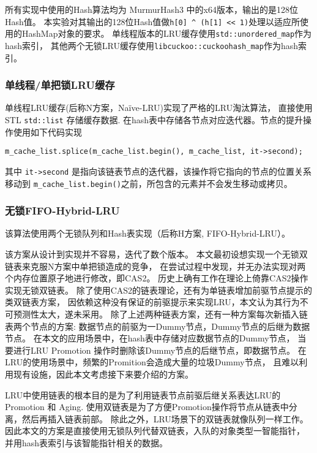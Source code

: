 所有实现中使用的Hash算法均为 MurmurHash3 中的x64版本，输出的是128位Hash值。
本实验对其输出的128位Hash值做\verb|h[0] ^ (h[1] << 1)|处理以适应所使用的HashMap对象的要求。
单线程版本的LRU缓存使用\verb|std::unordered_map|作为hash索引，
其他两个无锁LRU缓存使用\verb|libcuckoo::cuckoohash_map|作为hash索引。

\subsubsection{单线程/单把锁LRU缓存}

单线程LRU缓存(后称N方案，Na\"{i}ve-LRU)实现了严格的LRU淘汰算法，
直接使用STL \verb|std::list| 存储缓存数据.
在hash表中存储各节点对应迭代器。节点的提升操作使用如下代码实现 
\begin{verbatim}
m_cache_list.splice(m_cache_list.begin(), m_cache_list, it->second);
\end{verbatim}
其中 \verb|it->second| 是指向该链表节点的迭代器，该操作将它指向的节点的位置关系移动到
\verb|m_cache_list.begin()|之前，所包含的元素并不会发生移动或拷贝。

\subsubsection{无锁FIFO-Hybrid-LRU}

该算法使用两个无锁队列和Hash表实现（后称H方案, FIFO-Hybrid-LRU）。

该方案从设计到实现并不容易，迭代了数个版本。
本文最初设想实现一个无锁双链表来克服N方案中单把锁造成的竞争，
在尝试过程中发现，并无办法实现对两个内存位置原子地进行修改，即CAS2。
历史上确有工作在理论上倚靠CAS2操作实现无锁双链表。
除了使用CAS2的链表理论，还有为单链表增加前驱节点提示的类双链表方案，
因依赖这种没有保证的前驱提示来实现LRU，本文认为其行为不可预测性太大，遂未采用。
除了上述两种链表方案，还有一种方案每次新插入链表两个节点的方案:
数据节点的前驱为一Dummy节点，Dummy节点的后继为数据节点。
在本文的应用场景中，在hash表中存储对应数据节点的Dummy节点，
当要进行LRU Promotion 操作时删除该Dummy节点的后继节点，即数据节点。
在LRU的使用场景中，频繁的Promition会造成大量的垃圾Dummy节点，
且难以利用现有设施，因此本文考虑接下来要介绍的方案。

LRU中使用链表的根本目的是为了利用链表节点前驱后继关系表达LRU的 Promotion 和 Aging.
使用双链表是为了方便Promotion操作将节点从链表中分离，然后再插入链表前部。
除此之外，LRU场景下的双链表就像队列一样工作。
因此本文的方案是直接使用无锁队列代替双链表，入队的对象类型一智能指针，
并用hash表索引与该智能指针相关的数据。

